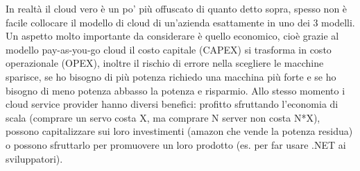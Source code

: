 \documentclass[11pt, twocolumn]{article}
\begin{document}
In realtà il cloud vero è un po' più offuscato di quanto detto sopra, spesso non è facile collocare il modello di cloud di un'azienda esattamente in uno dei 3 modelli.\\
Un aspetto molto importante da considerare è quello economico, cioè grazie al modello pay-as-you-go cloud il costo capitale (CAPEX) si trasforma in costo operazionale (OPEX), inoltre il rischio di errore nella scegliere le macchine sparisce, se ho bisogno di più potenza richiedo una macchina più forte e se ho bisogno di meno potenza abbasso la potenza e risparmio.
Allo stesso momento i cloud service provider hanno diversi benefici: profitto sfruttando l'economia di scala (comprare un servo costa X, ma comprare N server non costa N*X), possono capitalizzare sui loro investimenti (amazon che vende la potenza residua) o possono sfruttarlo per promuovere un loro prodotto (es. per far usare .NET ai sviluppatori).
\end{document}
